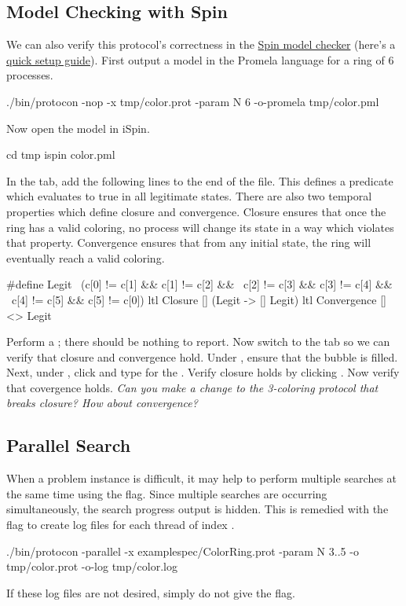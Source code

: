 \subsection{Model Checking with Spin}
We can also verify this protocol's correctness in the \href{http://spinroot.com}{Spin model checker} (here's a \href{../../tut/spin.html}{quick setup guide}).
First output a model in the Promela language for a ring of $6$ processes.
\begin{code}
./bin/protocon -nop -x tmp/color.prot -param N 6 -o-promela tmp/color.pml
\end{code}
Now open the model in iSpin.
\begin{code}
cd tmp
ispin color.pml
\end{code}
In the  tab, add the following lines to the end of the file.
This defines a predicate  which evaluates to true in all legitimate states.
There are also two temporal properties which define closure and convergence.
Closure ensures that once the ring has a valid coloring, no process will change its state in a way which violates that property.
Convergence ensures that from any initial state, the ring will eventually reach a valid coloring.
\begin{code}
#define Legit \
  (c[0] != c[1] && c[1] != c[2] && \
   c[2] != c[3] && c[3] != c[4] && \
   c[4] != c[5] && c[5] != c[0])
ltl Closure { [] (Legit -> [] Legit) }
ltl Convergence { [] <> Legit }
\end{code}
Perform a \ilkey{Syntax Check}; there should be nothing to report.
Now switch to the  tab so we can verify that closure and convergence hold.
Under , ensure that the  bubble is filled.
Next, under \ilkey{Never Claims}, click \ilkey{use claim} and type  for the .
Verify closure holds by clicking \ilkey{Run}.
Now verify that covergence holds.
\textit{Can you make a change to the 3-coloring protocol that breaks closure? How about convergence?}

\subsection{Parallel Search}
When a problem instance is difficult, it may help to perform multiple searches at the same time using the  flag.
Since multiple searches are occurring simultaneously, the search progress output is hidden.
This is remedied with the  flag to create log files  for each thread of index .
\begin{code}
./bin/protocon -parallel -x examplespec/ColorRing.prot -param N 3..5 -o tmp/color.prot -o-log tmp/color.log
\end{code}
If these log files are not desired, simply do not give the flag.

